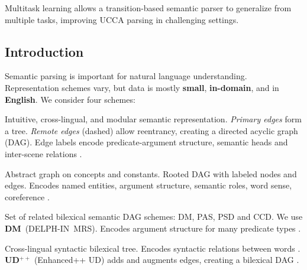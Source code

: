 \documentclass[a0,portrait]{a0poster}
\begin{document}
\vspace{1cm}
\titlespacing*{\section}{0pt}{8mm}{5mm}


\begin{adjustbox}{margin=3mm,frame,minipage=.6\linewidth,center}
\Large\color{Navy}
Multitask learning allows a transition-based semantic parser
to generalize from multiple tasks,
improving UCCA parsing in challenging settings.
\end{adjustbox}


\begin{multicols}{2}


\color{Black}

\section*{Introduction}

Semantic parsing is important for natural language understanding.
Representation schemes vary,
but data is mostly \textbf{small}, \textbf{in-domain}, and in \textbf{English}.
\hfill We consider four schemes:
\begin{itemize}[nosep,labelsep=1em]
{\color{Indigo} \item[\textbf{UCCA}:] Intuitive, cross-lingual, and modular semantic representation.
    \textit{Primary edges} form a tree. \textit{Remote edges} (dashed) allow reentrancy,
    creating a directed acyclic graph (DAG).
    Edge labels encode predicate-argument structure, semantic heads and inter-scene relations
    \cite{abend2013universal}.}
{\color{DarkGreen} \item[\textbf{AMR}:] Abstract graph on concepts and constants.
    Rooted DAG with labeled nodes and edges.
    Encodes named entities, argument structure, semantic roles, word sense, coreference \cite{banarescu2013abstract}.}
{\color{DarkRed} \item[\textbf{SDP}:] Set of related bilexical semantic DAG schemes: DM, PAS, PSD and CCD.
    We use \textbf{DM}~(DELPH-IN~MRS).
    Encodes argument structure for many predicate types \cite{oepen2016towards}.}
{\color{DarkBlue} \item[\textbf{UD}:] Cross-lingual syntactic bilexical tree.
    Encodes syntactic relations between words \cite{nivre2016universal}. \\
    \textbf{UD$^{++}$} (Enhanced++ UD) adds and augments edges, creating a bilexical DAG
    \cite{SCHUSTER16.779}.}
\end{itemize}


\end{multicols}
\end{document}
